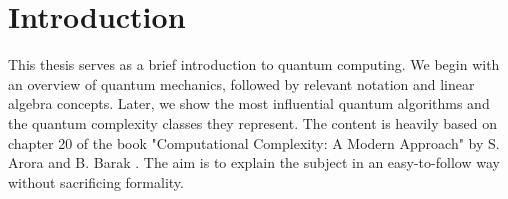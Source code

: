 \section*{Introduction}
This thesis serves as a brief introduction to quantum computing. We begin with an overview of quantum mechanics, followed by relevant notation and linear algebra concepts. Later, we show the most influential quantum algorithms and the quantum complexity classes they represent. The content is heavily based on chapter 20 of the book "Computational Complexity: A Modern Approach" by S. Arora and B. Barak \cite{thebook}. The aim is to explain the subject in an easy-to-follow way without sacrificing formality.
